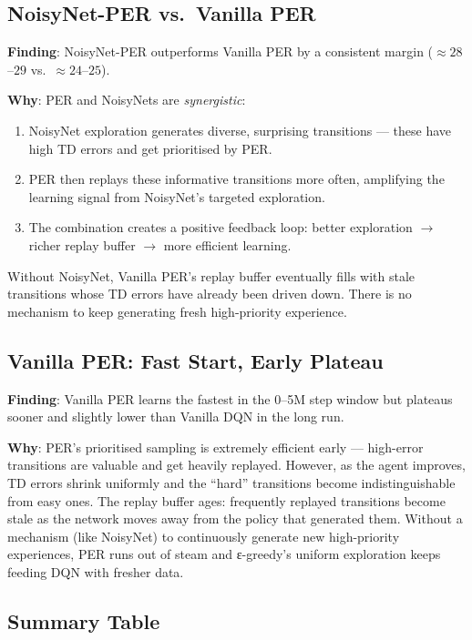 \documentclass[12pt]{article}
\begin{document}
\subsection{NoisyNet-PER vs.\ Vanilla PER}

\textbf{Finding}: NoisyNet-PER outperforms Vanilla PER by a consistent margin ($\approx 28$--$29$
vs.\ $\approx 24$--$25$).

\textbf{Why}: PER and NoisyNets are \emph{synergistic}:
\begin{enumerate}
  \item NoisyNet exploration generates diverse, surprising transitions --- these have
        high TD errors and get prioritised by PER.
  \item PER then replays these informative transitions more often, amplifying the
        learning signal from NoisyNet's targeted exploration.
  \item The combination creates a positive feedback loop: better exploration $\rightarrow$
        richer replay buffer $\rightarrow$ more efficient learning.
\end{enumerate}
Without NoisyNet, Vanilla PER's replay buffer eventually fills with stale transitions
whose TD errors have already been driven down. There is no mechanism to keep generating
fresh high-priority experience.

\subsection{Vanilla PER: Fast Start, Early Plateau}

\textbf{Finding}: Vanilla PER learns the fastest in the 0--5M step window but plateaus
sooner and slightly lower than Vanilla DQN in the long run.

\textbf{Why}: PER's prioritised sampling is extremely efficient early --- high-error
transitions are valuable and get heavily replayed. However, as the agent improves,
TD errors shrink uniformly and the ``hard'' transitions become indistinguishable from easy ones.
The replay buffer ages: frequently replayed transitions become stale as the network
moves away from the policy that generated them.
Without a mechanism (like NoisyNet) to continuously generate new high-priority experiences,
PER runs out of steam and ε-greedy's uniform exploration keeps feeding DQN with fresher data.

\subsection{Summary Table}
\end{document}
